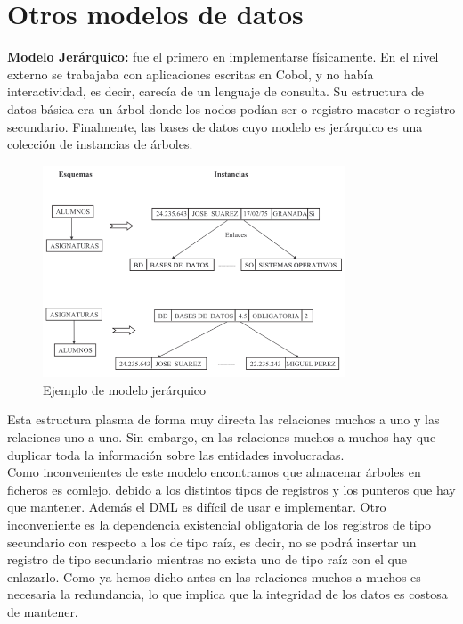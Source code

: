 \documentclass[a4paper,11pt]{article}
\begin{document}
\section{Otros modelos de datos}
\textbf{Modelo Jerárquico:} fue el primero en implementarse físicamente. En el nivel externo se trabajaba con aplicaciones escritas en Cobol, y no había interactividad, es decir, carecía de un lenguaje de consulta. Su estructura de datos básica era un árbol donde los nodos podían ser o registro maestor o registro secundario. Finalmente, las bases de datos cuyo modelo es jerárquico es una colección de instancias de árboles. \\

\begin{figure}[h]
\centering
\includegraphics[scale=1,width=0.8\textwidth]{modelo_jerarquico.png}
\caption{Ejemplo de modelo jerárquico}
\end{figure}

Esta estructura plasma de forma muy directa las relaciones muchos a uno y las relaciones uno a uno. Sin embargo, en las relaciones muchos a muchos hay que duplicar toda la información sobre las entidades involucradas. \\

Como inconvenientes de este modelo encontramos que almacenar árboles en ficheros es comlejo, debido a los distintos tipos de registros y los punteros que hay que mantener. Además el DML es difícil de usar e implementar. Otro inconveniente es la dependencia existencial obligatoria de los registros de tipo secundario con respecto a los de tipo raíz, es decir, no se podrá insertar un registro de tipo secundario mientras no exista uno de tipo raíz con el que enlazarlo. Como ya hemos dicho antes en las relaciones muchos a muchos es necesaria la redundancia, lo que implica que la integridad de los datos es costosa de mantener. \\
\end{document}
